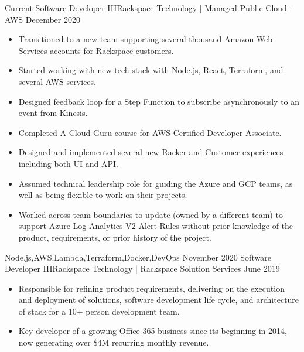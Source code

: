 \begin{experiences}
  \experience
    {Current}       {Software Developer III}{Rackspace Technology | Managed Public Cloud - AWS}
    {December 2020} {
                      \begin{itemize}
                        \item Transitioned to a new team supporting several thousand Amazon Web Services accounts for Rackspace customers.
                        \item Started working with new tech stack with Node.js, React, Terraform, and several AWS services.
                        \item Designed feedback loop for a Step Function to subscribe asynchronously to an event from Kinesis.
                        \item Completed A Cloud Guru course for AWS Certified Developer Associate.
                        \item Designed and implemented several new Racker and Customer experiences including both UI and API.
                        \item Assumed technical leadership role for guiding the Azure and GCP teams, as well as being flexible to work on their projects.
                        \item Worked across team boundaries to update  (owned by a different team) to support Azure Log Analytics V2 Alert Rules without prior knowledge of the product, requirements, or prior history of the project.
                      \end{itemize}
                    }
                    {Node.js,AWS,Lambda,Terraform,Docker,DevOps}
  \emptySeparator
  \experience
    {November 2020} {Software Developer III}{Rackspace Technology | Rackspace Solution Services}
    {June 2019}     {
                      \begin{itemize}
                        \item Responsible for refining product requirements, delivering on the execution and deployment of solutions, software development life cycle, and architecture of stack for a 10+ person development team.
                        \item Key developer of a growing Office 365 business since its beginning in 2014, now generating over \$4M recurring monthly revenue.

\end{itemize}}
\end{experiences}
